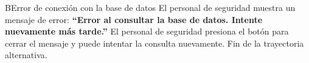 \begin{UCtrayectoriaA}{B}{Error de conexión con la base de datos}
	\UCpaso[\UCactor] El personal de seguridad muestra un mensaje de error: {\bf ``Error al consultar la base de datos. Intente nuevamente más tarde.''}
	\UCpaso[\UCactor] El personal de seguridad presiona el botón  para cerrar el mensaje y puede intentar la consulta nuevamente.
	\UCpaso Fin de la trayectoria alternativa.
\end{UCtrayectoriaA}

